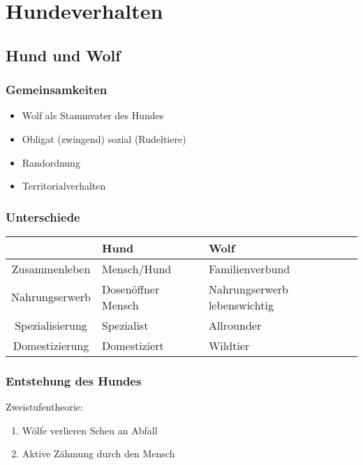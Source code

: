 \chapter{Hundeverhalten}
\label{ch:Hundeverhalten}

\section{Hund und Wolf}
\label{ch:Hundeverhalten1:sec:Hund_und_Wolf}

    \subsection{Gemeinsamkeiten}
    \begin{itemize}
        \item Wolf als Stammvater des Hundes
        \item Obligat (zwingend) sozial (Rudeltiere)
        \item Randordnung
        \item Territorialverhalten
    \end{itemize}

    \subsection{Unterschiede}
    \begin{center}
        \begin{tabular}{c|l|l}
            & \textbf{Hund} & \textbf{Wolf} \\
            \hline
            Zusammenleben & Mensch/Hund & Familienverbund \\
            Nahrungserwerb & Dosenöffner Mensch & Nahrungserwerb lebenswichtig \\
            Spezialisierung & Spezialist & Allrounder \\
            Domestizierung & Domestiziert & Wildtier
        \end{tabular}
    \end{center}

    \subsection{Entstehung des Hundes}
    Zweistufentheorie:
    \begin{enumerate}
        \item Wölfe verlieren Scheu an Abfall
        \item Aktive Zähmung durch den Mensch
    \end{enumerate}

